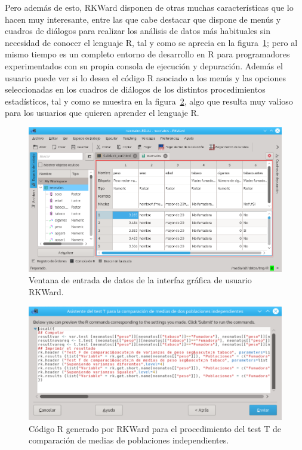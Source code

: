 \documentclass[a4paper,10pt,twoside]{article}
\newcommand{\rkward}{\textsf{RKWard}}
\begin{document}
Pero además de esto, \rkward{} disponen de otras muchas características que lo hacen muy interesante, entre las que cabe
destacar que dispone de menús y cuadros de diálogos para realizar los análisis de datos más habituales sin necesidad de
conocer el lenguaje R, tal y como se aprecia en la figura~\ref{f:ventana-datos-rkward}; pero al mismo tiempo es un
completo entorno de desarrollo en R para programadores experimentados con su propia consola de ejecución y depuración.
Además el usuario puede ver si lo desea el código R asociado a los menús y las opciones seleccionadas en los
cuadros de diálogos de los distintos procedimientos estadísticos, tal y como se muestra en la
figura~\ref{f:codigo-test-t}, algo que resulta muy valioso para los usuarios que quieren aprender el lenguaje R.

\begin{figure}[htbp!]
\centering
\includegraphics[width=\textwidth]{img/ventana_datos_rkward.png}
\caption{Ventana de entrada de datos de la interfaz gráfica de usuario \rkward{}.}
\label{f:ventana-datos-rkward}
\end{figure}

\begin{figure}[htbp!]
\centering
\includegraphics[width=\textwidth]{img/codigo_t_test.png}
\caption{Código R generado por \rkward{} para el procedimiento del test T de comparación de medias de poblaciones
independientes.}
\label{f:codigo-test-t}
\end{figure}
\end{document}
